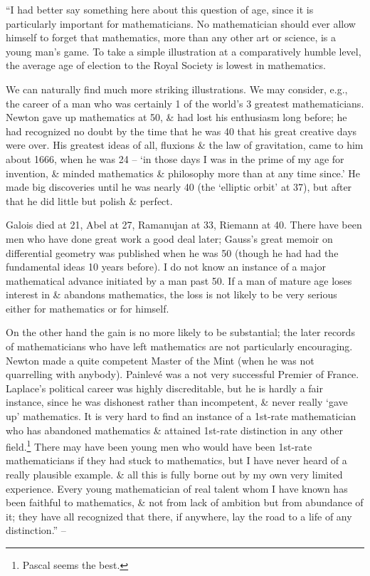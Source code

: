 \documentclass{article}
\numberwithin{equation}{section}
\begin{document}
 ``I had better say something here about this question of age, since it is particularly important for mathematicians. No mathematician should ever allow himself to forget that mathematics, more than any other art or science, is a young man's game. To take a simple illustration at a comparatively humble level, the average age of election to the Royal Society is lowest in mathematics.

We can naturally find much more striking illustrations. We may consider, e.g., the career of a man who was certainly 1 of the world's 3 greatest mathematicians. Newton gave up mathematics at 50, \& had lost his enthusiasm long before; he had recognized no doubt by the time that he was 40 that his great creative days were over. His greatest ideas of all, fluxions \& the law of gravitation, came to him about 1666, when he was 24 -- `in those days I was in the prime of my age for invention, \& minded mathematics \& philosophy more than at any time since.' He made big discoveries until he was nearly 40 (the `elliptic orbit' at 37), but after that he did little but polish \& perfect.

Galois died at 21, Abel at 27, Ramanujan at 33, Riemann at 40. There have been men who have done great work a good deal later; Gauss's great memoir on differential geometry was published when he was 50 (though he had had the fundamental ideas 10 years before). I do not know an instance of a major mathematical advance initiated by a man past 50. If a man of mature age loses interest in \& abandons mathematics, the loss is not likely to be very serious either for mathematics or for himself.

On the other hand the gain is no more likely to be substantial; the later records of mathematicians who have left mathematics are not particularly encouraging. Newton made a quite competent Master of the Mint (when he was not quarrelling with anybody). Painlev\'e was a not very successful Premier of France. Laplace's political career was highly discreditable, but he is hardly a fair instance, since he was dishonest rather than incompetent, \& never really `gave up' mathematics. It is very hard to find an instance of a 1st-rate mathematician who has abandoned mathematics \& attained 1st-rate distinction in any other field.\footnote{Pascal seems the best.} There may have been young men who would have been 1st-rate mathematicians if they had stuck to mathematics, but I have never heard of a really plausible example. \& all this is fully borne out by my own very limited experience. Every young mathematician of real talent whom I have known has been faithful to mathematics, \& not from lack of ambition but from abundance of it; they have all recognized that there, if anywhere, lay the road to a life of any distinction.'' -- \cite[pp. 70--73]{Hardy1992}
\end{document}

